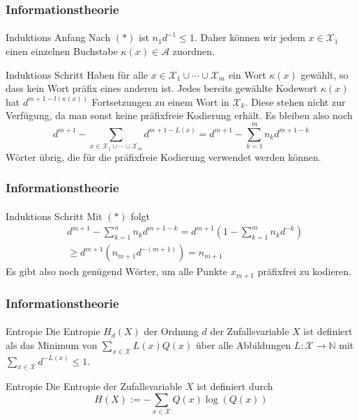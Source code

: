 \documentclass{beamer}
\begin{document}
\begin{frame}
    \frametitle{Informationstheorie}
\framesubtitle{}

\begin{block}{ Induktions Anfang}
Nach $(*)$ ist $n_1d^{-1} \leq 1$. Daher können wir jedem $x \in \mathcal{X}_1$ einen einzelnen Buchstabe $\kappa(x) \in \mathcal{A}$ zuordnen.
\end{block}

\begin{block}{ Induktions Schritt}
Haben für alle $x \in \mathcal{X}_1 \cup \cdots \cup \mathcal{X}_m$ ein Wort $\kappa(x)$ gewählt, so dass kein Wort präfix eines  anderen ist. Jedes bereits gewählte Kodewort $\kappa(x)$ hat $d^{m+1 - l(\kappa(x))}$ Fortsetzungen zu einem Wort in $\mathcal{X}_k$. Diese stehen nicht zur Verfügung, da man sonst keine präfixfreie Kodierung erhält. Es bleiben also noch 
$$ d^{m+1} - \sum_{x \in \mathcal{X}_1 \cup \cdots \cup \mathcal{X}_m } d^{m+ 1 - L(x)} = d^{m+1} - \sum_{k=1}^{m} n_k d^{m+1-k}$$ 
Wörter übrig, die für die präfixfreie Kodierung verwendet werden können.
\end{block}

 \end{frame}


\begin{frame}
    \frametitle{Informationstheorie}
\framesubtitle{}



\begin{block}{ Induktions Schritt}
Mit $(*)$ folgt
\begin{align*}
& d^{m+1} - \sum_{k=1}^{n} n_k d^{m+1-k} = d^{m+1} (1 - \sum_{k=1}^{m} n_k d^{-k}) \\
& \geq d^{m+1}(n_{m+1} d^{-(m+1)}) = n_{m+1}
\end{align*}
Es gibt also noch genügend Wörter, um alle Punkte $x_{m+1}$ präfixfrei zu kodieren.
\end{block}

 \end{frame}


\begin{frame}
    \frametitle{Informationstheorie}
\framesubtitle{}

\begin{block}{Entropie}
Die Entropie $H_d(X)$ der Ordnung $d$ der Zufallsvariable $X$ ist definiert als das Minimum von $\sum_{x \in \mathcal{X} }  L(x) Q(x)$ über alle Abbildungen $L: \mathcal{X} \to \mathbb{N}$ mit $\sum_{x \in \mathcal{X} }  d^{-L(x)} \leq 1$.
\end{block}

\begin{block}{Entropie}
Die Entropie der Zufallsvariable $X$ ist definiert durch 
$$ H(X) := -\sum_{x \in \mathcal{X} }   Q(x) \log(Q(x))$$
\end{block}


 \end{frame}
\end{document}
